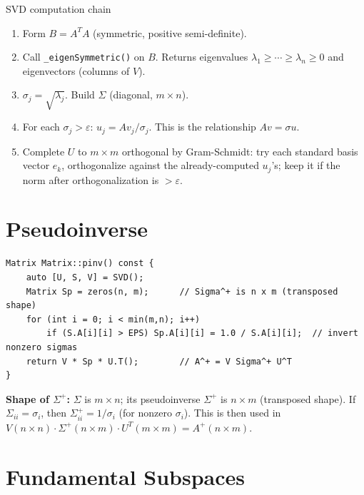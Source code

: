 \documentclass[12pt, a4paper]{article}
\newcommand{\fn}[1]{\texttt{\small\color{funcgreen}#1}}
\begin{document}
\begin{flowbox}{SVD computation chain}
\begin{enumerate}[noitemsep]
  \item Form $B = A^TA$ (symmetric, positive semi-definite).
  \item Call \fn{\_eigenSymmetric()} on $B$.  Returns eigenvalues
        $\lambda_1 \geq \cdots \geq \lambda_n \geq 0$ and eigenvectors
        (columns of $V$).
  \item $\sigma_j = \sqrt{\lambda_j}$.  Build $\Sigma$ (diagonal, $m \times n$).
  \item For each $\sigma_j > \varepsilon$: $u_j = A v_j / \sigma_j$.  This is
        the relationship $Av = \sigma u$.
  \item Complete $U$ to $m \times m$ orthogonal by Gram-Schmidt:  try each
        standard basis vector $e_k$, orthogonalize against the already-computed
        $u_j$'s; keep it if the norm after orthogonalization is $> \varepsilon$.
\end{enumerate}
\end{flowbox}

\section{Pseudoinverse}

\begin{lstlisting}
Matrix Matrix::pinv() const {
    auto [U, S, V] = SVD();
    Matrix Sp = zeros(n, m);      // Sigma^+ is n x m (transposed shape)
    for (int i = 0; i < min(m,n); i++)
        if (S.A[i][i] > EPS) Sp.A[i][i] = 1.0 / S.A[i][i];  // invert nonzero sigmas
    return V * Sp * U.T();        // A^+ = V Sigma^+ U^T
}
\end{lstlisting}

\textbf{Shape of $\Sigma^+$:}  $\Sigma$ is $m \times n$; its pseudoinverse
$\Sigma^+$ is $n \times m$ (transposed shape).  If $\Sigma_{ii} = \sigma_i$,
then $\Sigma^+_{ii} = 1/\sigma_i$ (for nonzero $\sigma_i$).  This is then
used in $V(n \times n) \cdot \Sigma^+(n \times m) \cdot U^T(m \times m) =
A^+(n \times m)$.

\section{Fundamental Subspaces}
\end{document}
